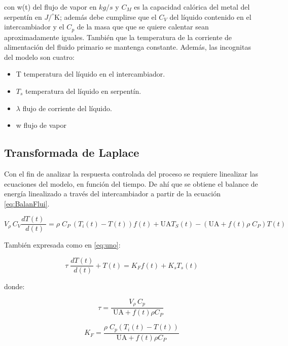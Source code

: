 \documentclass[12pt,letterpaper]{article}     %
\begin{document}
con w(t) del flujo de vapor en $kg/s$ y $C_M$ es la capacidad calórica del metal del serpentín en $J/^{\circ}$K; además debe cumplirse que el $C_V$ del líquido contenido en el intercambiador y el $C_p$ de la masa que que se quiere calentar sean aproximadamente iguales. También que la temperatura de la corriente de alimentación del fluido primario se mantenga constante.
Además, las incognitas del modelo son cuatro:
\begin{itemize}
    \item T    temperatura del líquido en el intercambiador.
    \item $T_s$   temperatura del líquido en serpentín.
    \item $\lambda$   flujo de corriente del líquido.
    \item w    flujo de vapor
\end{itemize} 


\subsection{Transformada de Laplace}
Con el fin de analizar la respuesta controlada del proceso se requiere linealizar las ecuaciones del modelo, en función del tiempo.
De ahí que se obtiene el balance de energía linealizado a través del intercambiador a partir de la ecuación \ref{eq:BalanFlui}.

\begin{equation}
V_{\rho \;} C_V \frac{dT \left(t\right)\;}{\;d\left(t\right)}=\rho \;C_{P\;} \left(T_i(t) -T(t) \right)f\left(t\right)+\mathrm{UA}T  _S \left(t\right)-\left(\mathrm{UA}+f(t) \rho \;C_P \right)T \left(t\right)
\end{equation}

También expresada como en \ref{eq:uno}:

\begin{equation}
    \tau \;\frac{dT\left(t\right)}{\;d\left(t\right)}+T\left(t\right)=K_F f\left(t\right)+K_s T_s \left(t\right)
    \label{eq:uno}
\end{equation}


donde:

\begin{equation}
    \tau =\frac{V_{\rho \;} C_p }{{\;\mathrm{UA}+f(t) \rho } {C_P }}\;
\end{equation}

\begin{equation}
 K_F =\frac{\rho \;C_p \left(T_i (t) -T(t) \right)}{\mathrm{UA}+f(t) \rho C_P } 
\end{equation}
\end{document}
